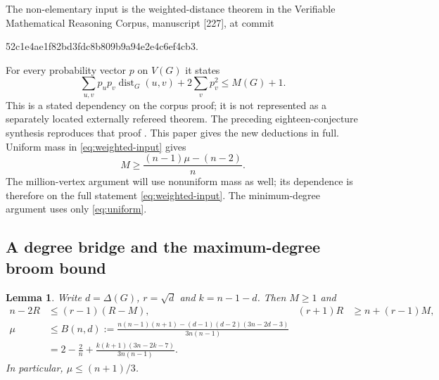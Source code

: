 \documentclass[11pt,a4paper]{article}
\newtheorem{lemma}[theorem]{Lemma}
\theoremstyle{remark}\newtheorem{remark}[theorem]{Remark}
\DeclareMathOperator{\dist}{dist}
\begin{document}
The non-elementary input is the weighted-distance theorem in the
Verifiable Mathematical Reasoning Corpus, manuscript [227], at commit
\begin{center}\small\ttfamily
52c1e4ae1f82bd3fdc8b809b9a94e2e4c6ef4cb3.
\end{center}
For every probability vector $p$ on $V(G)$ it states
\begin{equation}\label{eq:weighted-input}\tag{W}
 \sum_{u,v}p_up_v\dist_G(u,v)+2\sum_vp_v^2\le M(G)+1.
\end{equation}
This is a stated dependency on the corpus proof; it is not represented
as a separately located externally refereed theorem.
The preceding eighteen-conjecture synthesis reproduces that proof
\cite{status}. This paper gives the new deductions in full.
Uniform mass in \eqref{eq:weighted-input} gives
\begin{equation}\label{eq:uniform}\tag{CH-U}
 M\ge\frac{(n-1)\mu-(n-2)}n.
\end{equation}
The million-vertex argument will use nonuniform mass as well; its
dependence is therefore on the full statement \eqref{eq:weighted-input}.
The minimum-degree argument uses only \eqref{eq:uniform}.

\subsection{A degree bridge and the maximum-degree broom bound}

\begin{lemma}\label{lem:basic}
Write $d=\Delta(G)$, $r=\sqrt d$ and $k=n-1-d$. Then $M\ge1$ and
\begin{align}
 n-2R&\le(r-1)(R-M),& (r+1)R&\ge n+(r-1)M,\label{eq:bridge}\\
 \mu&\le B(n,d):=
 \frac{n(n-1)(n+1)-(d-1)(d-2)(3n-2d-3)}{3n(n-1)}
 \nonumber\\[-2pt]
 &=2-\frac2n+
 \frac{k(k+1)(3n-2k-7)}{3n(n-1)}.\label{eq:broom}
\end{align}
In particular, $\mu\le(n+1)/3$.
\end{lemma}
\end{document}
